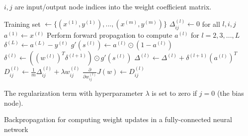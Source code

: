 \begin{algorithm}
  \(i,j\) are input/output node indices into the weight coefficient matrix.
  \begin{algorithmic}[1]
    \State Training set \(\gets \{ (x^{(1)},y^{(1)}), ..., (x^{(m)},y^{(m)}) \}\)
    \State \(\Delta_{ij}^{(l)} \gets 0\) for all \(l,i,j\)
      \State \(a^{(1)} \gets x^{(t)}\)
      \State Perform forward propagation to compute \(a^{(l)}\) for \(l=2,3,...,L\)
      \State \(\delta^{(L)} \gets a^{(L)} - y^{(t)}\)
        \State \( g'(s^{(l)}) \gets a^{(l)} \odot (1 - a^{(l)}) \)
        \State \( \delta^{(l)} \gets ( (w^{(l)})^{T} \delta^{(l+1)} ) \odot g'(s^{(l)}) \)
        \State \( \Delta^{(l)} \gets \Delta^{(l)} + \delta^{(l+1)} (a^{(l)})^{T}  \)
        \State \(D_{ij}^{(l)} \gets \frac{1}{m} \Delta_{ij}^{(l)} + \lambda w_{ij}^{(l)} \)
      \EndFor
    \EndFor
    \State \( \frac{\partial}{\partial w_{ij}^{(l)}} J(w) \gets D_{ij}^{(l)} \)
  \end{algorithmic}
  The regularization term with hyperparameter \(\lambda\) is set to zero if \(j = 0\) (the bias node).
  \caption{Backpropagation for computing weight updates in a fully-connected neural network}
\end{algorithm}

\algnewcommand{}
\algnewcommand{}
\algnewcommand{}
\algnewcommand{}
\algnewcommand{}
\algnewcommand{}
\algnewcommand{}
\algnewcommand{}
\algnewcommand{}

